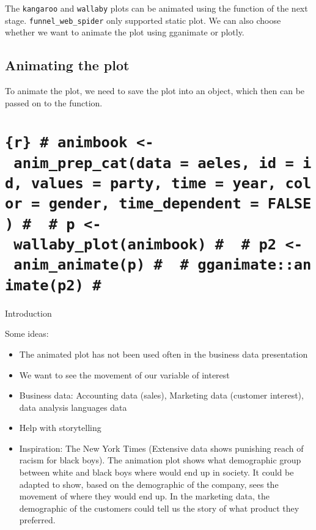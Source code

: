 The \texttt{kangaroo} and \texttt{wallaby} plots can be animated using the function of the next stage. \texttt{funnel\_web\_spider} only supported static plot. We can also choose whether we want to animate the plot using gganimate or plotly.

\hypertarget{animating-the-plot}{%
\subsection{Animating the plot}\label{animating-the-plot}}

To animate the plot, we need to save the plot into an object, which then can be passed on to the function.

\hypertarget{r-animbook---anim_prep_catdata-aeles-id-id-values-party-time-year-color-gender-time_dependent-false-p---wallaby_plotanimbook-p2---anim_animatep-gganimateanimatep2}{%
\section{\texorpdfstring{\texttt{\{r\}\ \#\ animbook\ \textless{}-\ anim\_prep\_cat(data\ =\ aeles,\ id\ =\ id,\ values\ =\ party,\ time\ =\ year,\ color\ =\ gender,\ time\_dependent\ =\ FALSE)\ \#\ \ \#\ p\ \textless{}-\ wallaby\_plot(animbook)\ \#\ \ \#\ p2\ \textless{}-\ anim\_animate(p)\ \#\ \ \#\ gganimate::animate(p2)\ \#}}{\{r\} \# animbook \textless- anim\_prep\_cat(data = aeles, id = id, values = party, time = year, color = gender, time\_dependent = FALSE) \#  \# p \textless- wallaby\_plot(animbook) \#  \# p2 \textless- anim\_animate(p) \#  \# gganimate::animate(p2) \#}}\label{r-animbook---anim_prep_catdata-aeles-id-id-values-party-time-year-color-gender-time_dependent-false-p---wallaby_plotanimbook-p2---anim_animatep-gganimateanimatep2}}

Introduction

Some ideas:

\begin{itemize}
\tightlist
\item
  The animated plot has not been used often in the business data presentation
\item
  We want to see the movement of our variable of interest
\item
  Business data: Accounting data (sales), Marketing data (customer interest), data analysis languages data
\item
  Help with storytelling
\item
  Inspiration: The New York Times (Extensive data shows punishing reach of racism for black boys). The animation plot shows what demographic group between white and black boys where would end up in society. It could be adapted to show, based on the demographic of the company, sees the movement of where they would end up. In the marketing data, the demographic of the customers could tell us the story of what product they preferred.
\end{itemize}

